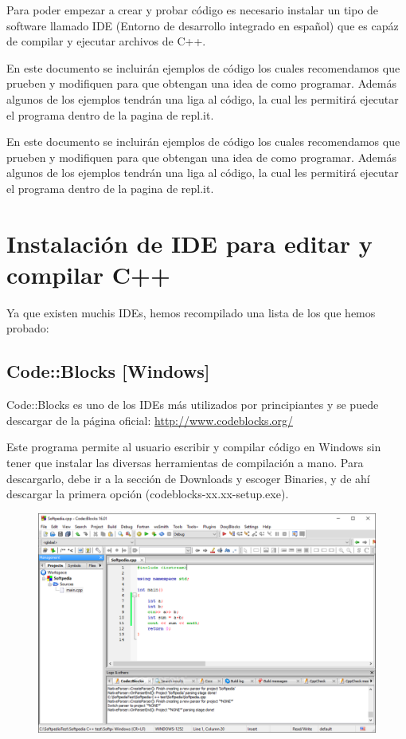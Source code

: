 \documentclass{article}
\begin{document}
Para poder empezar a crear y probar código es necesario instalar un tipo de software llamado IDE (Entorno de desarrollo integrado en español) que es capáz de compilar y ejecutar archivos de C++.

En este documento se incluirán ejemplos de código los cuales recomendamos que prueben y modifiquen para que obtengan una idea de como programar. Además algunos de los ejemplos tendrán una liga al código, la cual les permitirá ejecutar el programa dentro de la pagina de repl.it.

En este documento se incluirán ejemplos de código los cuales recomendamos que prueben y modifiquen para que obtengan una idea de como programar. Además algunos de los ejemplos tendrán una liga al código, la cual les permitirá ejecutar el programa dentro de la pagina de repl.it.

\section{Instalación de IDE para editar y compilar C++}

Ya que existen muchis IDEs, hemos recompilado una lista de los que hemos probado:

\subsection{Code::Blocks [Windows]}
Code::Blocks es uno de los IDEs más utilizados por principiantes y se puede descargar de la página oficial: \url{http://www.codeblocks.org/}

Este programa permite al usuario escribir y compilar código en Windows sin tener que instalar las diversas herramientas de compilación a mano. Para descargarlo, debe ir a la sección de Downloads y escoger Binaries, y de ahí descargar la primera opción (codeblocks-xx.xx-setup.exe).

\begin{figure}[H]
    \centering
    \includegraphics[width=0.5\paperwidth]{CodeBlocks}
\end{figure}
\end{document}
